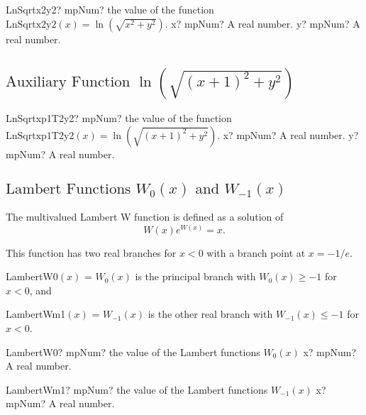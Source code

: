 \begin{mpFunctionsExtract}
	\mpFunctionTwo
	{LnSqrtx2y2? mpNum? the value of the function $\text{LnSqrtx2y2}(x) =\ln \left(\sqrt{x^2+y^2} \right)$.}
	{x? mpNum? A real number.}
	{y? mpNum? A real number.}
\end{mpFunctionsExtract}



\subsection{\texorpdfstring{$\text{Auxiliary Function }\ln \left(\sqrt{(x+1)^2+y^2} \right)$}{LnSqrtxp1T2y2}}

\begin{mpFunctionsExtract}
	\mpFunctionTwo
	{LnSqrtxp1T2y2? mpNum? the value of the function $\text{LnSqrtxp1T2y2}(x) =\ln \left(\sqrt{(x+1)^2+y^2} \right)$.}
	{x? mpNum? A real number.}
	{y? mpNum? A real number.}
\end{mpFunctionsExtract}




\subsection{\texorpdfstring{$\text{Lambert Functions }W_0(x) \text{ and }W_{-1}(x)$}{Lambert functions}}

The multivalued Lambert W function is defined as a solution of
\begin{equation}
	W(x) e ^{W (x)} = x.
\end{equation}

This function has two real branches for $x < 0$ with a branch point at $x = -1/e$.

LambertW0$(x)$ = $W_0 (x)$ is the principal branch with $W_0 (x) \geq -1$ for $x < 0$, and

LambertWm1$(x)$ = $W_{-1} (x)$ is the other real branch with $W_{-1}(x) \leq -1$ for $x < 0$.


\vspace{0.6cm}
\begin{mpFunctionsExtract}
	\mpFunctionOne
	{LambertW0? mpNum? the value of the Lambert functions $W_0(x)$}
	{x? mpNum? A real number.}
\end{mpFunctionsExtract}


\vspace{0.6cm}
\begin{mpFunctionsExtract}
	\mpFunctionOne
	{LambertWm1? mpNum? the value of the Lambert functions $W_{-1}(x)$}
	{x? mpNum? A real number.}
\end{mpFunctionsExtract}

